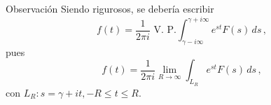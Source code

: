\begin{obs}{Observación}
    Siendo rigurosos, se debería escribir 
    \begin{equation*}
        f(t) = \frac{1}{2\pi i} \text{ V. P.} \int_{\gamma - i \infty}^{\gamma + i \infty} e^{st} F(s) \,ds \, ,
    \end{equation*}
    pues
    \begin{equation*}
        f(t) = \frac{1}{2\pi i} \lim_{R \to \infty} \int_{L_R} e^{st} F(s) \, ds \, ,
    \end{equation*}
    con $L_R: s = \gamma + it, - R\leq t \leq R$.
\end{obs}










